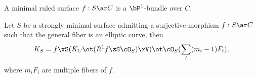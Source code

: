 \documentclass[article, a4paper, twoside]{universal}
\begin{document}
\begin{thm}[Proposition~4.7]
	A minimal ruled surface $f:S\ar C$ is a $\bP^{1}$-bundle over $C$.
\end{thm}



\begin{thm}[Theorem~9.18]
	Let $S$ be a strongly minimal surface admitting a surjective morphism $f:S\ar C$ such that the general fiber is an elliptic curve, then
	\[
		K_{S}=f\xS(K_{C}\ot(R^{1}f\zS\cO_{S})\xV)\ot\cO_{S}(\sum_{i}(m_{i}-1)F_{i}),
	\]
	where $m_{i}F_{i}$ are multiple fibers of $f$.
\end{thm}


\printref
\end{document}
